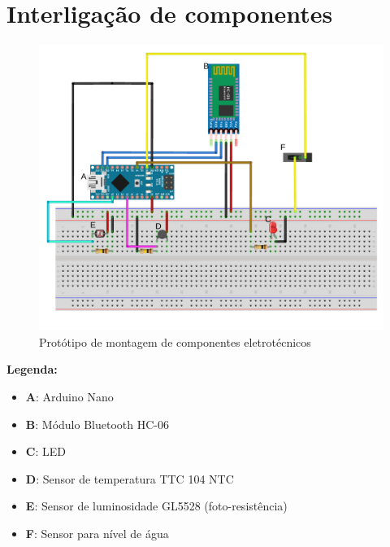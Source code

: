\chapter{Interligação de componentes}
\label{interlapd}

\begin{figure}[h]
	\centering
	\includegraphics[width=\linewidth]{esquemas/arduino-fritzing/esquema-arduino_bb.pdf}
	\caption{Protótipo de montagem de componentes eletrotécnicos}
	\label{dikw}
\end{figure}


\textbf{Legenda: }

\begin{itemize}
	\item \textbf{A}: Arduino Nano
	\item \textbf{B}: Módulo Bluetooth HC-06
	\item \textbf{C}: \ac{LED}
	\item \textbf{D}: Sensor de temperatura TTC 104 NTC
	\item \textbf{E}: Sensor de luminosidade GL5528 (foto-resistência) 
	\item \textbf{F}: Sensor para nível de água 
\end{itemize}
